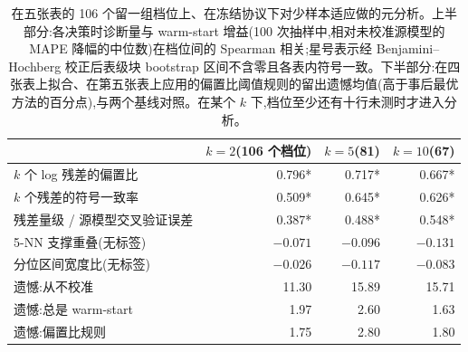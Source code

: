 \documentclass[11pt,a4paper]{ctexart}
\begin{document}
\begin{table}[t]
\centering\small
\caption{在五张表的 106 个留一组档位上、在冻结协议下对少样本适应做的元分析。上半部分:各决策时诊断量与 warm-start 增益(100 次抽样中,相对未校准源模型的 MAPE 降幅的中位数)在档位间的 Spearman 相关;星号表示经 Benjamini--Hochberg 校正后表级块 bootstrap 区间不含零且各表内符号一致。下半部分:在四张表上拟合、在第五张表上应用的偏置比阈值规则的留出遗憾均值(高于事后最优方法的百分点),与两个基线对照。在某个 $k$ 下,档位至少还有十行未测时才进入分析。}
\label{tab:hj}
\begin{tabular}{lrrr}
\toprule
 & $k=2$(106 个档位) & $k=5$(81) & $k=10$(67) \\
\midrule
$k$ 个 log 残差的偏置比 & 0.796* & 0.717* & 0.667* \\
$k$ 个残差的符号一致率 & 0.509* & 0.645* & 0.626* \\
残差量级 / 源模型交叉验证误差 & 0.387* & 0.488* & 0.548* \\
5-NN 支撑重叠(无标签) & $-0.071$ & $-0.096$ & $-0.131$ \\
分位区间宽度比(无标签) & $-0.026$ & $-0.117$ & $-0.083$ \\
\midrule
遗憾:从不校准 & 11.30 & 15.89 & 15.71 \\
遗憾:总是 warm-start & 1.97 & 2.60 & 1.63 \\
遗憾:偏置比规则 & 1.75 & 2.80 & 1.80 \\
\bottomrule
\end{tabular}
\end{table}
\end{document}
